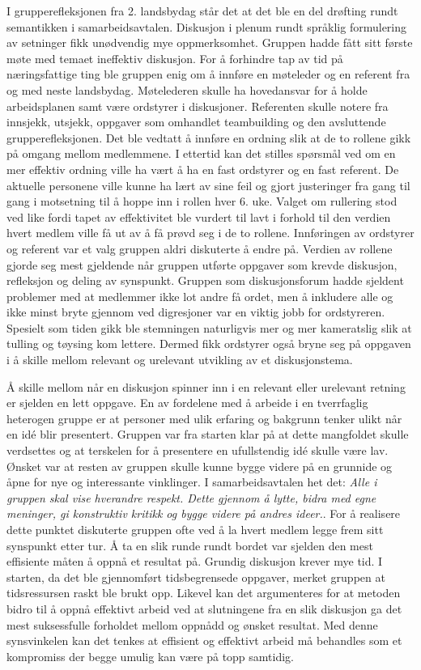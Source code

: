 I grupperefleksjonen fra 2. landsbydag står det at det ble en del drøfting rundt semantikken i samarbeidsavtalen. 
Diskusjon i plenum rundt språklig formulering av setninger fikk unødvendig mye oppmerksomhet.
Gruppen hadde fått sitt første møte med temaet ineffektiv diskusjon.
For å forhindre tap av tid på næringsfattige ting ble gruppen enig om å innføre en møteleder og en referent fra og med neste landsbydag.
Møtelederen skulle ha hovedansvar for å holde arbeidsplanen samt være ordstyrer i diskusjoner.
Referenten skulle notere fra innsjekk, utsjekk, oppgaver som omhandlet teambuilding og den avsluttende grupperefleksjonen.
Det ble vedtatt å innføre en ordning slik at de to rollene gikk på omgang mellom medlemmene.
I ettertid kan det stilles spørsmål ved om en mer effektiv ordning ville ha vært å ha en fast ordstyrer og en fast referent.
De aktuelle personene ville kunne ha lært av sine feil og gjort justeringer fra gang til gang i motsetning til å hoppe inn i rollen hver 6. uke.
Valget om rullering stod ved like fordi tapet av effektivitet ble vurdert til lavt i forhold til den verdien hvert medlem ville få ut av å få prøvd seg i de to rollene.
Innføringen av ordstyrer og referent var et valg gruppen aldri diskuterte å endre på. 
Verdien av rollene gjorde seg mest gjeldende når gruppen utførte oppgaver som krevde diskusjon, refleksjon og deling av synspunkt.
Gruppen som diskusjonsforum hadde sjeldent problemer med at medlemmer ikke lot andre få ordet, men å inkludere alle og ikke minst bryte gjennom ved digresjoner var en viktig jobb for ordstyreren. 
Spesielt som tiden gikk ble stemningen naturligvis mer og mer kameratslig slik at tulling og tøysing kom lettere.
Dermed fikk ordstyrer også bryne seg på oppgaven i å skille mellom relevant og urelevant utvikling av et diskusjonstema.

Å skille mellom når en diskusjon spinner inn i en relevant eller urelevant retning er sjelden en lett oppgave.
En av fordelene med å arbeide i en tverrfaglig heterogen gruppe er at personer med ulik erfaring og bakgrunn tenker ulikt når en id\'{e} blir presentert.
Gruppen var fra starten klar på at dette mangfoldet skulle verdsettes og at terskelen for å presentere en ufullstendig id\'{e} skulle være lav.
Ønsket var at resten av gruppen skulle kunne bygge videre på en grunnide og åpne for nye og interessante vinklinger. 
I samarbeidsavtalen het det: \textit{Alle i gruppen skal vise hverandre respekt. Dette gjennom å lytte, bidra med egne meninger, gi konstruktiv kritikk og bygge videre på andres ideer.}.
For å realisere dette punktet diskuterte gruppen ofte ved å la hvert medlem legge frem sitt synspunkt etter tur.
Å ta en slik runde rundt bordet var sjelden den mest effisiente måten å oppnå et resultat på.
Grundig diskusjon krever mye tid. 
I starten, da det ble gjennomført tidsbegrensede oppgaver, merket gruppen at tidsressursen raskt ble brukt opp.
Likevel kan det argumenteres for at metoden bidro til å oppnå effektivt arbeid ved at slutningene fra en slik diskusjon ga det mest suksessfulle forholdet mellom oppnådd og ønsket resultat.
Med denne synsvinkelen kan det tenkes at effisient og effektivt arbeid må behandles som et kompromiss der begge umulig kan være på topp samtidig.

